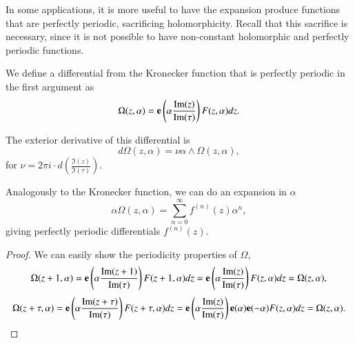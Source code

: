In some applications, it is more useful to have the expansion produce functions that are perfectly periodic, sacrificing holomorphicity.
Recall that this sacrifice is necessary, since it is not possible to have non-constant holomorphic and perfectly periodic functions.

\begin{definition}
    We define a differential from the Kronecker function that is perfectly periodic in the first argument as
    \begin{equation}
        \Omega(z,\alpha) = \mathbf{e}\left( \alpha \frac{\operatorname{Im}(z)}{\operatorname{Im}(\tau)}\right) F(z,\alpha) dz.
    \end{equation}

    The exterior derivative of this differential is
    \begin{equation}
        d\Omega(z,\alpha) = \nu \alpha \wedge \Omega(z,\alpha),
    \end{equation}
    for $\nu = 2 \pi i \cdot d\!\left(\frac{\Im(z)}{\Im(\tau)}\right)$.

    Analogously to the Kronecker function, we can do an expansion in $\alpha$
    \begin{equation}
        \alpha \Omega(z,\alpha) = \sum_{n=0}^\infty f^{(n)}(z) \alpha^n,
    \end{equation}
    giving perfectly periodic differentials $f^{(n)}(z)$.
\end{definition}

\begin{proof}
    We can easily show the periodicity properties of $\Omega$,
    \begin{equation}
        \Omega(z+1,\alpha) = \mathbf{e}\left( \alpha \frac{\operatorname{Im}(z+1)}{\operatorname{Im}(\tau)}\right) F(z+1,\alpha) dz = \mathbf{e}\left( \alpha \frac{\operatorname{Im}(z)}{\operatorname{Im}(\tau)}\right) F(z,\alpha) dz = \Omega(z,\alpha),
    \end{equation}
    \begin{equation}
        \Omega(z+\tau,\alpha) = \mathbf{e}\left( \alpha \frac{\operatorname{Im}(z+\tau)}{\operatorname{Im}(\tau)} \right) F(z+\tau,\alpha) dz = \mathbf{e}\left( \alpha \frac{\operatorname{Im}(z)}{\operatorname{Im}(\tau)}\right) \mathbf{e}(\alpha) \mathbf{e}(-\alpha) F(z,\alpha) dz = \Omega(z,\alpha).
    \end{equation}
\end{proof}

